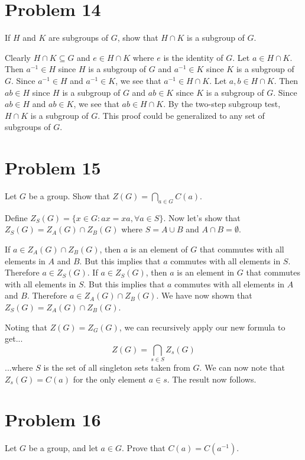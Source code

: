 \documentclass{article}
\begin{document}
\section*{Problem 14}

If $H$ and $K$ are subgroups of $G$, show that $H\cap K$ is a subgroup of $G$.

Clearly $H\cap K\subseteq G$ and $e\in H\cap K$ where $e$ is the identity of $G$.
Let $a\in H\cap K$.  Then $a^{-1}\in H$ since $H$ is a subgroup of $G$ and $a^{-1}\in K$
since $K$ is a subgroup of $G$.  Since $a^{-1}\in H$ and $a^{-1}\in K$, we see that
$a^{-1}\in H\cap K$.  Let $a,b\in H\cap K$.  Then $ab\in H$ since $H$ is a subgroup of $G$
and $ab\in K$ since $K$ is a subgroup of $G$.  Since $ab\in H$ and $ab\in K$, we see that
$ab\in H\cap K$.  By the two-step subgroup test, $H\cap K$ is a subgroup of $G$.
This proof could be generalized to any set of subgroups of $G$.

\section*{Problem 15}

Let $G$ be a group.  Show that $Z(G)=\bigcap_{a\in G}C(a)$.

Define $Z_S(G)=\{x\in G:ax=xa,\forall a\in S\}$.
Now let's show that $Z_S(G)=Z_A(G)\cap Z_B(G)$ where $S=A\cup B$
and $A\cap B=\emptyset$.

If $a\in Z_A(G)\cap Z_B(G)$, then $a$ is an element of $G$ that commutes with all
elements in $A$ and $B$.
But this implies that $a$ commutes with all elements in $S$.  Therefore $a\in Z_S(G)$.
If $a\in Z_S(G)$, then $a$ is an element in $G$ that commutes with all elements in $S$.
But this implies that $a$ commutes with all elements in $A$ and $B$.  Therefore
$a\in Z_A(G)\cap Z_B(G)$.  We have now shown that $Z_S(G)=Z_A(G)\cap Z_B(G)$.

Noting that $Z(G)=Z_G(G)$, we can recursively apply our new formula to get...
\begin{equation*}
Z(G) = \bigcap_{s\in S} Z_{s}(G)
\end{equation*}
...where $S$ is the set of all singleton sets taken from $G$.  We can now
note that $Z_{s}(G)=C(a)$ for the only element $a\in s$.
The result now follows.

\section*{Problem 16}

Let $G$ be a group, and let $a\in G$.  Prove that $C(a)=C(a^{-1})$.
\end{document}
